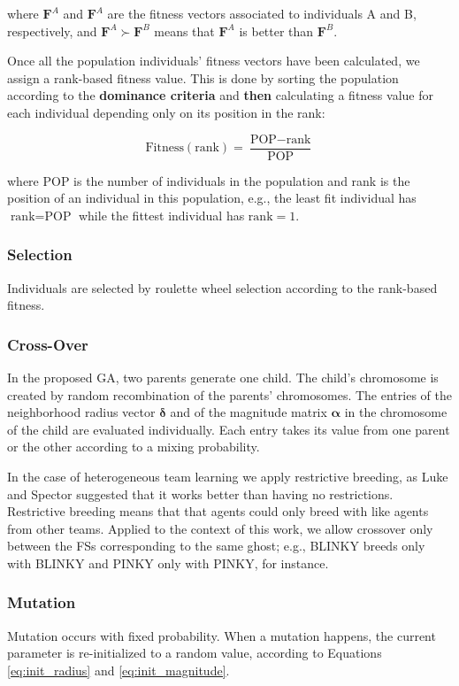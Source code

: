 \documentclass[journal]{IEEEtran}
\begin{document}
where $\mathbf{F}^A$ and $\mathbf{F}^A$ are the fitness vectors associated to individuals A and B, respectively, and $\mathbf{F}^A \succ \mathbf{F}^B$ means that $\mathbf{F}^A$ is better than $\mathbf{F}^B$.

Once all the population individuals' fitness vectors have been calculated, we assign a rank-based fitness value. This is done by sorting the population according to the \textbf{dominance criteria} and \textbf{then} calculating a fitness value for each individual depending only on its position in the rank:

\begin{equation}
\label{eq:rankFitness}
	\text{Fitness}(\text{rank}) = \frac{\text{POP} - \text{rank}}{\text{POP}}
\end{equation}

where POP is the number of individuals in the population and rank is the position of an individual in this population, e.g., the least fit individual has $\text{rank} = \text{POP}$ while the fittest individual has $\text{rank} = 1$.

\subsubsection{Selection}
Individuals are selected by roulette wheel selection according to the rank-based fitness.

\subsubsection{Cross-Over}
In the proposed GA, two parents generate one child. The child's chromosome is created by random recombination of the parents' chromosomes. The entries of the neighborhood radius vector $\boldsymbol\delta$ and of the magnitude matrix $\boldsymbol\alpha$ in the chromosome of the child are evaluated individually. Each entry takes its value from one parent or the other according to a mixing probability.

In the case of heterogeneous team learning we apply restrictive
breeding, as Luke and Spector \cite{Luke1996} suggested that it works
better than having no restrictions. Restrictive breeding means that
that agents could only breed with like agents from other
teams. Applied to the context of this work, we allow crossover only
between the FSs corresponding to the same ghost; e.g., BLINKY breeds
only with BLINKY and PINKY only with PINKY, for instance.

\subsubsection{Mutation}
Mutation occurs with fixed probability. When a mutation happens, the current parameter is re-initialized to a random value, according to Equations \eqref{eq:init_radius} and \eqref{eq:init_magnitude}.
\end{document}
